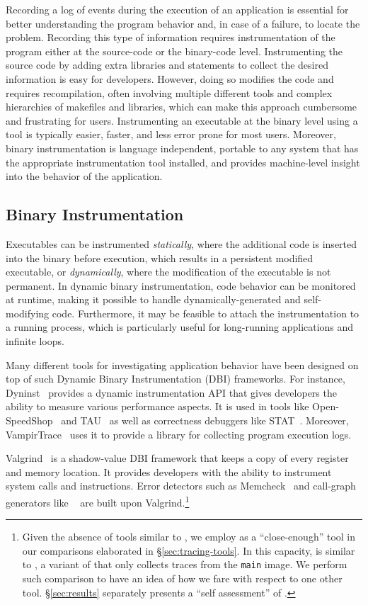 Recording a log of events during the execution of an application is essential for better understanding the program behavior and, in case of a failure, to locate the problem.
%
Recording this type of information requires instrumentation of the program either at the source-code or the binary-code level.
%
Instrumenting the source code by adding extra libraries and statements to collect the desired information is easy for developers.
%
However, doing so modifies the code and requires recompilation, often involving multiple different tools and complex hierarchies of makefiles and libraries, which can make this approach cumbersome and frustrating for users.
%
Instrumenting an executable at the binary level using a tool is typically easier, faster, and less error prone for most users.
%
Moreover, binary instrumentation is language independent, portable to any system that has the appropriate instrumentation tool installed, and provides machine-level insight into the behavior of the application.
%

\subsection{Binary Instrumentation}
Executables can be instrumented \textit{statically}, where the additional code is inserted into the binary before execution, which results in a persistent modified executable, or \textit{dynamically}, where the modification of the executable is not permanent. In dynamic binary instrumentation, code behavior can be monitored at runtime, making it possible to handle dynamically-generated and self-modifying code. Furthermore, it may be feasible to attach the instrumentation to a running process, which is particularly useful for long-running applications and infinite loops.

Many different tools for investigating application behavior have been designed on top of such Dynamic Binary Instrumentation (DBI) frameworks. For instance, Dyninst~\cite{dyninst} provides a dynamic instrumentation API that gives developers the ability to measure various performance aspects. It is used in tools like Open-SpeedShop~\cite{openss} and TAU~\cite{tau} as well as correctness debuggers like STAT~\cite{stat}. Moreover, VampirTrace~\cite{vampirt} uses it to provide a library for collecting program execution logs. 

Valgrind~\cite{valgrind} is a shadow-value DBI framework that keeps a copy of every register and memory location. It provides developers with the ability to instrument system calls and instructions. Error detectors such as Memcheck~\cite{memcheck} and call-graph generators like \callgrind~\cite{callgrind} are built upon Valgrind.\footnote{Given the absence of tools similar to \parlot, we employ \callgrind
 as a ``close-enough'' tool in our comparisons elaborated in \S\ref{sec:tracing-tools}.
 In this capacity, \callgrind is similar to \parlotm, a variant of \parlot that only collects
 traces from the {\tt main} image. We perform such comparison to have an idea of how we fare
 with respect to one other tool. \S\ref{sec:results} separately
 presents a ``self assessment'' of \parlot.}

